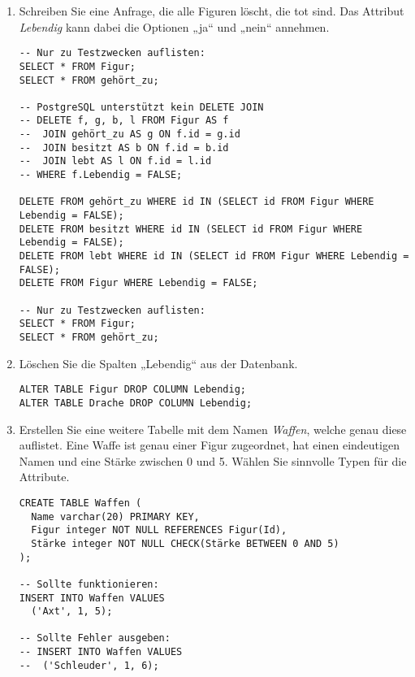 \documentclass{lehramt-informatik-aufgabe}
\begin{document}
\begin{enumerate}
%

\item Schreiben Sie eine Anfrage, die alle Figuren löscht, die tot sind.
Das Attribut \emph{Lebendig} kann dabei die Optionen „ja“ und „nein“
annehmen.

\begin{antwort}
\begin{verbatim}
-- Nur zu Testzwecken auflisten:
SELECT * FROM Figur;
SELECT * FROM gehört_zu;

-- PostgreSQL unterstützt kein DELETE JOIN
-- DELETE f, g, b, l FROM Figur AS f
--  JOIN gehört_zu AS g ON f.id = g.id
--  JOIN besitzt AS b ON f.id = b.id
--  JOIN lebt AS l ON f.id = l.id
-- WHERE f.Lebendig = FALSE;

DELETE FROM gehört_zu WHERE id IN (SELECT id FROM Figur WHERE Lebendig = FALSE);
DELETE FROM besitzt WHERE id IN (SELECT id FROM Figur WHERE Lebendig = FALSE);
DELETE FROM lebt WHERE id IN (SELECT id FROM Figur WHERE Lebendig = FALSE);
DELETE FROM Figur WHERE Lebendig = FALSE;

-- Nur zu Testzwecken auflisten:
SELECT * FROM Figur;
SELECT * FROM gehört_zu;
\end{verbatim}
\end{antwort}

%

\item Löschen Sie die Spalten „Lebendig“ aus der Datenbank.

\begin{antwort}
\begin{verbatim}
ALTER TABLE Figur DROP COLUMN Lebendig;
ALTER TABLE Drache DROP COLUMN Lebendig;
\end{verbatim}
\end{antwort}

%

\item Erstellen Sie eine weitere Tabelle mit dem Namen \emph{Waffen},
welche genau diese auflistet. Eine Waffe ist genau einer Figur
zugeordnet, hat einen eindeutigen Namen und eine Stärke zwischen 0 und
5. Wählen Sie sinnvolle Typen für die Attribute.

\begin{antwort}
\begin{verbatim}
CREATE TABLE Waffen (
  Name varchar(20) PRIMARY KEY,
  Figur integer NOT NULL REFERENCES Figur(Id),
  Stärke integer NOT NULL CHECK(Stärke BETWEEN 0 AND 5)
);

-- Sollte funktionieren:
INSERT INTO Waffen VALUES
  ('Axt', 1, 5);

-- Sollte Fehler ausgeben:
-- INSERT INTO Waffen VALUES
--  ('Schleuder', 1, 6);
\end{verbatim}
\end{antwort}
\end{enumerate}
\end{document}
